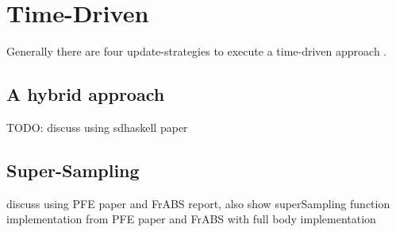 \section{Time-Driven}
Generally there are four update-strategies to execute a time-driven approach \cite{thaler_art_2017}.

\subsection{A hybrid approach}
TODO: discuss using sdhaskell paper

\subsection{Super-Sampling}
discuss using PFE paper and FrABS report, also show superSampling function implementation from PFE paper and FrABS with full body implementation
